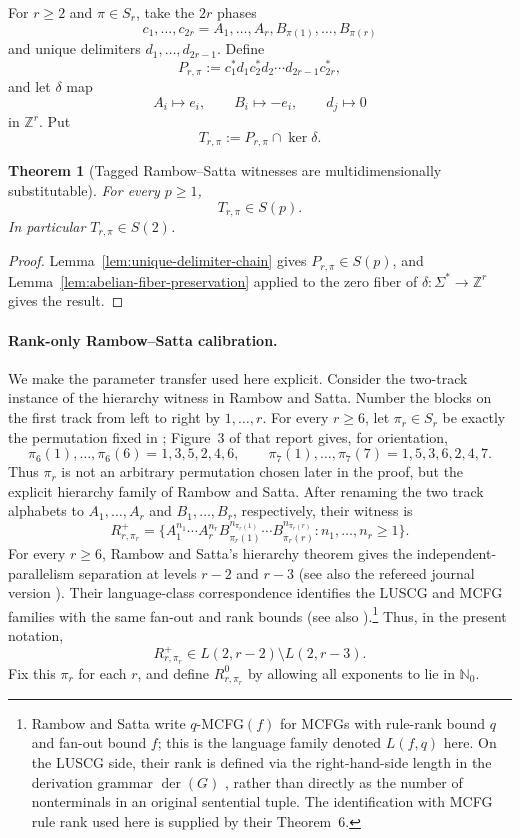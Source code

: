 \documentclass[11pt,a4paper]{article}
\numberwithin{equation}{section}
\theoremstyle{plain}
\newtheorem{theorem}{Theorem}[section]
\theoremstyle{definition}
\theoremstyle{remark}
\begin{document}
For $r\ge2$ and $\pi\in S_r$, take the $2r$ phases
\[
  c_1,\ldots,c_{2r}
  =A_1,\ldots,A_r,B_{\pi(1)},\ldots,B_{\pi(r)}
\]
and unique delimiters $d_1,\ldots,d_{2r-1}$.  Define
\[
  P_{r,\pi}:=c_1^*d_1c_2^*d_2\cdots d_{2r-1}c_{2r}^*,
\]
and let $\delta$ map
\[
  A_i\mapsto e_i,
  \qquad
  B_i\mapsto -e_i,
  \qquad
  d_j\mapsto0
\]
in $\mathbb Z^r$.  Put
\[
  T_{r,\pi}:=P_{r,\pi}\cap\ker\delta.
\]

\begin{theorem}[Tagged Rambow--Satta witnesses are multidimensionally substitutable]
\label{thm:tagged-rs-s2}
For every $p\ge1$,
\[
  T_{r,\pi}\in S(p).
\]
In particular $T_{r,\pi}\in S(2)$.
\end{theorem}

\begin{proof}
Lemma~\ref{lem:unique-delimiter-chain} gives $P_{r,\pi}\in S(p)$, and
Lemma~\ref{lem:abelian-fiber-preservation} applied to the zero fiber of
$\delta:\Sigma^*\to\mathbb Z^r$ gives the result.
\end{proof}

\paragraph{Rank-only Rambow--Satta calibration.}
We make the parameter transfer used here explicit.  Consider the two-track
instance of the hierarchy witness in Rambow and Satta.  Number the blocks on
the first track from left to right by $1,\ldots,r$.  For every $r\ge6$, let
$\pi_r\in S_r$ be exactly the permutation fixed in
\cite[Definition~6]{RambowSatta1994}; Figure~3 of that report gives, for
orientation,
\[
  \pi_6(1),\ldots,\pi_6(6)=1,3,5,2,4,6,
  \qquad
  \pi_7(1),\ldots,\pi_7(7)=1,5,3,6,2,4,7.
\]
Thus $\pi_r$ is not an arbitrary permutation chosen later in the proof, but
the explicit hierarchy family of Rambow and Satta.  After renaming the two
track alphabets to $A_1,\ldots,A_r$ and $B_1,\ldots,B_r$, respectively,
their witness is
\[
 R^+_{r,\pi_r}=\{A_1^{n_1}\cdots A_r^{n_r}
 B_{\pi_r(1)}^{n_{\pi_r(1)}}\cdots B_{\pi_r(r)}^{n_{\pi_r(r)}}:
 n_1,\ldots,n_r\ge1\}.
\]
For every $r\ge6$, Rambow and Satta's hierarchy theorem gives the
independent-parallelism separation at levels $r-2$ and $r-3$
\cite[Theorem~1]{RambowSatta1994} (see also the refereed journal version
\cite{RambowSatta1999}).  Their language-class correspondence identifies the LUSCG and MCFG families
with the same fan-out and rank bounds \cite[Theorem~6]{RambowSatta1994}
(see also \cite{RambowSatta1999}).\footnote{Rambow and Satta write $q$-MCFG$(f)$ for
MCFGs with rule-rank bound $q$ and fan-out bound $f$; this is the language
family denoted $L(f,q)$ here.  On the LUSCG side, their rank is defined via
the right-hand-side length in the derivation grammar $\operatorname{der}(G)$
\cite[Definition~4]{RambowSatta1994}, rather than directly as the number of
nonterminals in an original sentential tuple.  The identification with MCFG
rule rank used here is supplied by their Theorem~6.}  Thus,
in the present notation,
\[
 R^+_{r,\pi_r}\in L(2,r-2)\setminus L(2,r-3).
\]
Fix this $\pi_r$ for each $r$, and define $R^0_{r,\pi_r}$ by allowing all
exponents to lie in $\mathbb N_0$.
\end{document}
